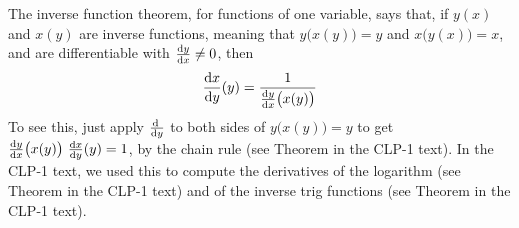 \begin{eg}\label{eg partials GG}
The inverse function theorem, for functions of one variable, says that,
if $y(x)$ and $x(y)$ are inverse functions, meaning that $y\big(x(y)\big)=y$
and $x\big(y(x)\big)=x$, and are differentiable with $\diff{y}{x}\ne 0$, then
\begin{equation*}
\diff{x}{y}(y) = \frac{1}{\diff{y}{x}\big(x(y)\big)}
\end{equation*}
To see this, just apply $\diff{}{y}$ to both sides of $y\big(x(y)\big)=y$
to get $\diff{y}{x}\big(x(y)\big)\ \diff{x}{y}(y)=1$, by the chain rule
(see Theorem  in the CLP-1 text).
In the CLP-1 text, we used this to compute the derivatives of the logarithm 
(see Theorem  in the CLP-1 text) and 
of the inverse trig functions (see Theorem 
in the CLP-1 text).


\end{eg}
